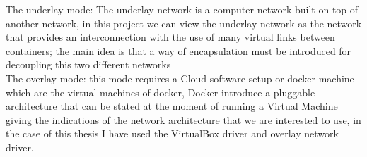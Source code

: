 The underlay mode: The underlay network is a computer network built on top of another network, in this project we can view the underlay network as the network that provides an interconnection with the use of many virtual links between containers; the main idea is that a way of encapsulation must be introduced for decoupling this two different networks \\

The overlay mode: this mode requires a Cloud software setup or docker-machine which are the virtual machines of docker, Docker introduce a pluggable architecture that can be stated at the moment of running a Virtual Machine giving the indications of the network architecture that we are interested to use, in the case of this thesis I have used the VirtualBox driver and overlay network driver. \\
